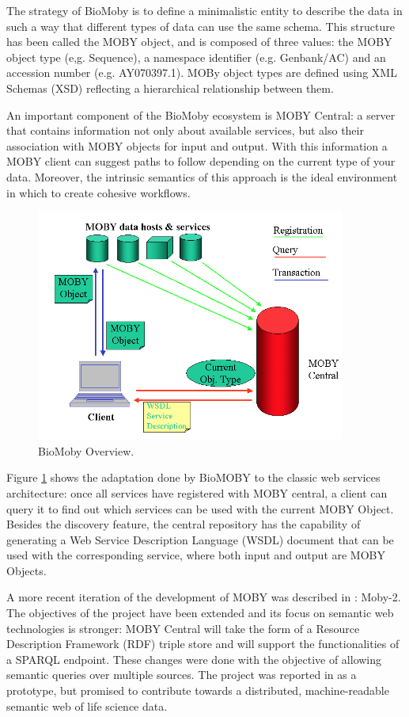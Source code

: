 The strategy of BioMoby is to define a minimalistic entity to describe the data in such a way that different types of data can use the same schema.
This structure has been called the MOBY object, and is composed of three values: the MOBY object type (e,g. Sequence), a namespace identifier (e.g. Genbank/AC) and an accession number (e.g. AY070397.1). MOBy object types are defined using XML Schemas (XSD) reflecting a hierarchical relationship between them.

An important component of the BioMoby ecosystem is MOBY Central: a server that contains information not only about available services, but also their association with MOBY objects for input and output. With this information a MOBY client can suggest paths to follow depending on the current type of your data. Moreover, the intrinsic semantics of this approach is the ideal environment in which to create cohesive workflows.

\begin{figure}  
\centering
\includegraphics[width=4in]{figures/MOBY_Overview.png}
\caption[BioMoby Overview.]{BioMoby Overview.
\label{fig:biomoby}}
\end{figure}

Figure \ref{fig:biomoby} shows the adaptation done by BioMOBY to the classic web services architecture: once all services have registered with MOBY central, a client can query it to find out which services can be used with the current MOBY Object. Besides the discovery feature, the central repository has the capability of generating a Web Service Description Language (WSDL) document that can be used with the corresponding service, where both input and output are MOBY Objects.

A more recent iteration of the development of MOBY was described in \cite{VAN2009}: Moby-2. The objectives of the project have been extended and its focus on semantic web technologies is stronger: MOBY Central will take the form of a Resource Description Framework (RDF) triple store and will support the functionalities of a SPARQL endpoint. These changes were done with the objective of allowing semantic queries over multiple sources. The project was reported in \cite{VAN2009} as a prototype, but promised to contribute towards a distributed, machine-readable semantic web of life science data.

